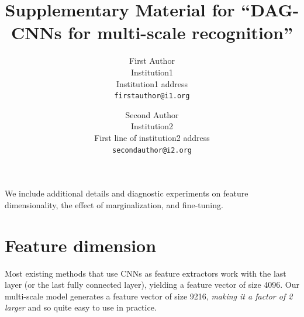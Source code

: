 \documentclass[10pt,twocolumn,letterpaper]{article}
\begin{document}
\title{Supplementary Material for ``DAG-CNNs for multi-scale recognition''}

\author{First Author\\
Institution1\\
Institution1 address\\
{\tt\small firstauthor@i1.org}
\and
Second Author\\
Institution2\\
First line of institution2 address\\
{\tt\small secondauthor@i2.org}
}

\maketitle

%

We include additional details and diagnostic experiments on feature dimensionality, the effect of marginalization, and fine-tuning.

\section{Feature dimension}
Most existing methods that use CNNs as feature extractors work with the last layer (or the last fully connected layer), yielding a feature vector of size 4096. Our multi-scale model generates a feature vector of size 9216, {\em making it a factor of 2 larger} and so quite easy to use in practice.
\end{document}
